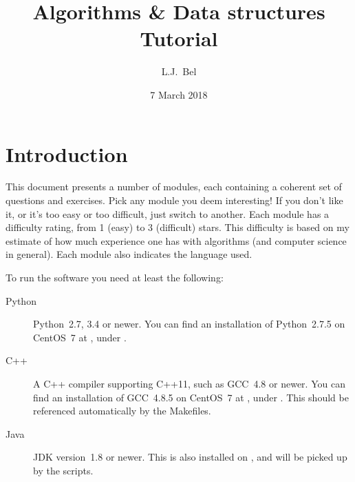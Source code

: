 \documentclass[12pt]{article}
\title{{Algorithms \& Data structures}\\{\large Tutorial}}
\author{L.J.~Bel}
\date{7 March 2018}
\begin{document}
\maketitle

\section*{Introduction}

This document presents a number of modules, each containing a coherent set of questions and exercises. Pick any module you deem interesting! If you don't like it, or it's too easy or too difficult, just switch to another. Each module has a difficulty rating, from 1 (easy) to 3 (difficult) stars. This difficulty is based on my estimate of how much experience one has with algorithms (and computer science in general). Each module also indicates the language used.

To run the software you need at least the following:
\begin{description}
    \item[Python] Python~2.7, 3.4 or newer. You can find an installation of Python~2.7.5 on CentOS~7 at , under .
    \item[C++] A C++ compiler supporting C++11, such as GCC~4.8 or newer. You can find an installation of GCC~4.8.5 on CentOS~7 at , under . This should be referenced automatically by the Makefiles.
    \item[Java] JDK version~1.8 or newer. This is also installed on , and will be picked up by the scripts.
\end{description}

\clearpage
\tableofcontents

\clearpage


\clearpage


\clearpage


\clearpage


\clearpage


\clearpage

\end{document}
